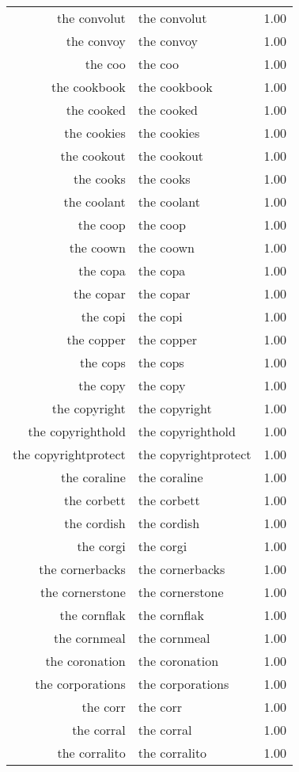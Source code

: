 \begin{table}[ht]
\begin{tabular}{rlr}
  the convolut & the convolut & 1.00 \\ 
  the convoy & the convoy & 1.00 \\ 
  the coo & the coo & 1.00 \\ 
  the cookbook & the cookbook & 1.00 \\ 
  the cooked & the cooked & 1.00 \\ 
  the cookies & the cookies & 1.00 \\ 
  the cookout & the cookout & 1.00 \\ 
  the cooks & the cooks & 1.00 \\ 
  the coolant & the coolant & 1.00 \\ 
  the coop & the coop & 1.00 \\ 
  the coown & the coown & 1.00 \\ 
  the copa & the copa & 1.00 \\ 
  the copar & the copar & 1.00 \\ 
  the copi & the copi & 1.00 \\ 
  the copper & the copper & 1.00 \\ 
  the cops & the cops & 1.00 \\ 
  the copy & the copy & 1.00 \\ 
  the copyright & the copyright & 1.00 \\ 
  the copyrighthold & the copyrighthold & 1.00 \\ 
  the copyrightprotect & the copyrightprotect & 1.00 \\ 
  the coraline & the coraline & 1.00 \\ 
  the corbett & the corbett & 1.00 \\ 
  the cordish & the cordish & 1.00 \\ 
  the corgi & the corgi & 1.00 \\ 
  the cornerbacks & the cornerbacks & 1.00 \\ 
  the cornerstone & the cornerstone & 1.00 \\ 
  the cornflak & the cornflak & 1.00 \\ 
  the cornmeal & the cornmeal & 1.00 \\ 
  the coronation & the coronation & 1.00 \\ 
  the corporations & the corporations & 1.00 \\ 
  the corr & the corr & 1.00 \\ 
  the corral & the corral & 1.00 \\ 
  the corralito & the corralito & 1.00 \\ 

\end{tabular}
\end{table}
